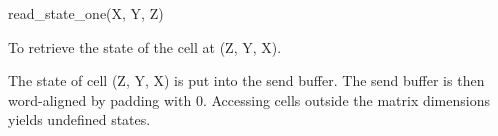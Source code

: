 

\format
read\_state\_one(X, Y, Z)

\purpose

To retrieve the state of the cell at (Z, Y, X).

\description

The state of cell (Z, Y, X) is put into the send buffer.
The send buffer is then word-aligned by padding with 0.
Accessing cells outside the matrix dimensions yields undefined states.
